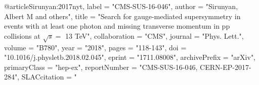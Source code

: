 @article{Sirunyan:2017nyt,
      label          = "CMS-SUS-16-046",
      author         = "Sirunyan, Albert M and others",
      title          = "{Search for gauge-mediated supersymmetry in events with
                        at least one photon and missing transverse momentum in pp
                        collisions at $\sqrt{s} = $ 13 TeV}",
      collaboration  = "CMS",
      journal        = "Phys. Lett.",
      volume         = "B780",
      year           = "2018",
      pages          = "118-143",
      doi            = "10.1016/j.physletb.2018.02.045",
      eprint         = "1711.08008",
      archivePrefix  = "arXiv",
      primaryClass   = "hep-ex",
      reportNumber   = "CMS-SUS-16-046, CERN-EP-2017-284",
      SLACcitation   = "%
}

